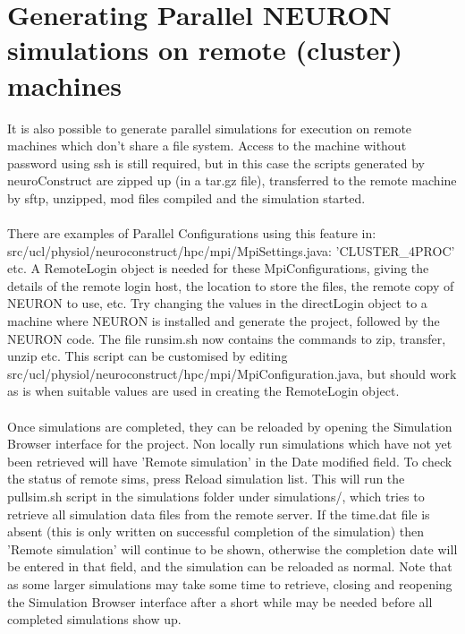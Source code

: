 \documentclass[11pt]{article}
\begin{document}
{\section {Generating Parallel NEURON simulations on remote (cluster) machines}
It is also possible to generate parallel simulations for execution on remote machines which don't share a file system. Access to the machine without password using ssh is still required, but in this case the scripts generated by neuroConstruct are zipped up (in a tar.gz file), transferred to the remote machine by sftp, unzipped, mod files compiled and the simulation started. 
\\\\There are examples of Parallel Configurations using this feature in:\\src/ucl/physiol/neuroconstruct/hpc/mpi/MpiSettings.java: 'CLUSTER\_4PROC' etc. A RemoteLogin object is needed for these MpiConfigurations, giving the details of the remote login host, the location to store the files, the remote copy of NEURON to use, etc. Try changing the values in the directLogin object to a machine where NEURON is installed and generate the project, followed by the NEURON code. The file runsim.sh now contains the commands to zip, transfer, unzip etc. This script can be customised by editing\\src/ucl/physiol/neuroconstruct/hpc/mpi/MpiConfiguration.java, but should work as is when suitable values are used in creating the RemoteLogin object.
\\\\Once simulations are completed, they can be reloaded by opening the Simulation Browser interface for the project. Non locally run simulations which have not yet been retrieved will have 'Remote simulation' in the Date modified field. To check the status of remote sims, press Reload simulation list. This will run the pullsim.sh script in the simulations folder under simulations/, which tries to retrieve all simulation data files from the remote server. If the time.dat file is absent (this is only written on successful completion of the simulation) then 'Remote simulation' will continue to be shown, otherwise the completion date will be entered in that field, and the simulation can be reloaded as normal. Note that as some larger simulations may take some time to retrieve, closing and reopening the Simulation Browser interface after a short while may be needed before all completed simulations show up.
 
 
}
\end{document}
